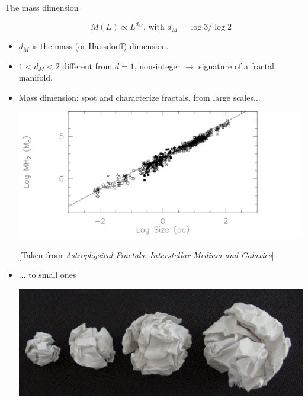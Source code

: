\documentclass[xcolor=x11names,compress,professionalfonts]{beamer}
\renewcommand{\(}{\begin{columns}}
\renewcommand{\)}{\end{columns}}
\newcommand{\<}[1]{\begin{column}{#1}}
\renewcommand{\>}{\end{column}}
\begin{document}
\begin{frame}{The mass dimension}
\begin{itemize}
\[ M(L) \propto L^{d_M} \text{, with } d_M = \log 3/\log 2 \]

	\item $d_M$ is the mass (or Hausdorff) dimension.
	
	\item $1 < d_M < 2$ different from $d = 1$, non-integer $\rightarrow$ signature of a fractal manifold.

\end{itemize}

\end{frame}

\begin{frame}

\begin{itemize}
\item Mass dimension: spot and characterize fractals, from large scales... 

	{\centering
    \includegraphics[scale=.18]{combes_interstellar_medium.png}
    \scriptsize
    
    [Taken from \textit{Astrophysical Fractals: Interstellar Medium and Galaxies}]
    
    }
\item  ... to small ones

  	\centering
    \includegraphics[scale=.3]{crumpled_paper.png}
    \scriptsize
\end{itemize}
\end{frame}
\end{document}
